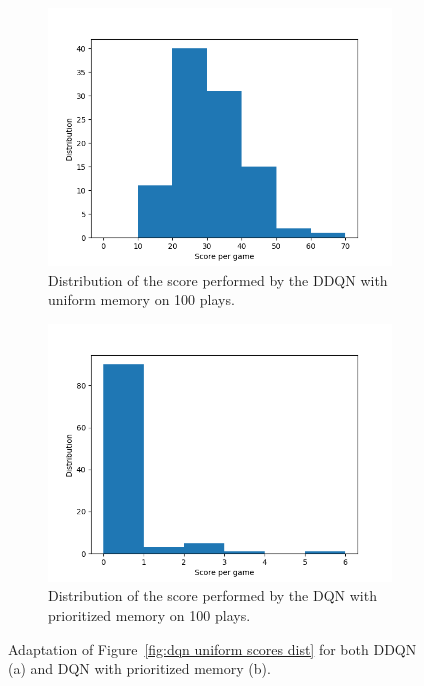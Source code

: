\documentclass[letterpaper]{article}
\begin{document}
\begin{figure}[!t]
	\vspace{-.3cm}
	\begin{subfigure}{.47\textwidth}
		\includegraphics[width=\textwidth]{figures/ddqn_uniform_score_distribution}
		\caption{Distribution of the score performed by the DDQN with uniform memory on 100 plays.}
	\end{subfigure}
	\hfill
	\begin{subfigure}{.47\textwidth}
		\includegraphics[width=\textwidth]{figures/dqn_prioritized_score_distribution}
		\caption{Distribution of the score performed by the DQN with prioritized memory on 100 plays.}
	\end{subfigure}
	\caption{Adaptation of Figure~\ref{fig:dqn uniform scores dist} for both DDQN (a) and DQN with prioritized memory (b).\label{fig:scores DDQN + DQNP}}
\end{figure}
\end{document}
